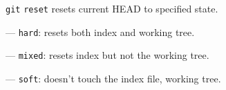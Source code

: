 %

\begin{compactenum}
\item [\texttt{git}] \texttt{reset} resets current HEAD to specified state.
\item [---] \texttt{hard}: resets both index and working tree.
\item [---] \texttt{mixed}: resets index but not the working tree.
\item [---] \texttt{soft}: doesn't touch the index file, working tree.
\end{compactenum}

%